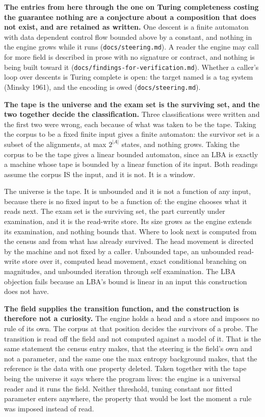 \textbf{The entries from here through the one on Turing completeness costing the guarantee nothing are a conjecture about a composition that does not exist, and are retained as written.} One descent is a finite automaton with data dependent control flow bounded above by a constant, and nothing in the engine grows while it runs (\texttt{docs/\allowbreak{}steering.md}). A reader the engine may call for more field is described in prose with no signature or contract, and nothing is being built toward it (\texttt{docs/\allowbreak{}findings-\allowbreak{}for-\allowbreak{}verification.md}). Whether a caller's loop over descents is Turing complete is open: the target named is a tag system (Minsky 1961), and the encoding is owed (\texttt{docs/\allowbreak{}steering.md}).

\textbf{The tape is the universe and the exam set is the surviving set, and the two together decide the classification.} Three classifications were written and the first two were wrong, each because of what was taken to be the tape. Taking the corpus to be a fixed finite input gives a finite automaton: the survivor set is a subset of the alignments, at max \(2^{|A|}\) states, and nothing grows. Taking the corpus to be the tape gives a linear bounded automaton, since an LBA is exactly a machine whose tape is bounded by a linear function of its input. Both readings assume the corpus IS the input, and it is not. It is a window.

The universe is the tape. It is unbounded and it is not a function of any input, because there is no fixed input to be a function of: the engine chooses what it reads next. The exam set is the surviving set, the part currently under examination, and it is the read-write store. Its size grows as the engine extends its examination, and nothing bounds that. Where to look next is computed from the census and from what has already survived. The head movement is directed by the machine and not fixed by a caller. Unbounded tape, an unbounded read-write store over it, computed head movement, exact conditional branching on magnitudes, and unbounded iteration through self examination. The LBA objection fails because an LBA's bound is linear in an input this construction does not have.

\textbf{The field supplies the transition function, and the construction is therefore not a curiosity.} The engine holds a head and a store and imposes no rule of its own. The corpus at that position decides the survivors of a probe. The transition is read off the field and not computed against a model of it. That is the same statement the census entry makes, that the steering is the field's own and not a parameter, and the same one the max entropy background makes, that the reference is the data with one property deleted. Taken together with the tape being the universe it says where the program lives: the engine is a universal reader and it runs the field. Neither threshold, tuning constant nor fitted parameter enters anywhere, the property that would be lost the moment a rule was imposed instead of read.

